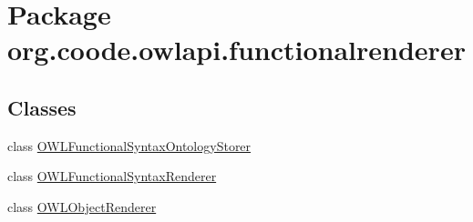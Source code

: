 \hypertarget{namespaceorg_1_1coode_1_1owlapi_1_1functionalrenderer}{\section{Package org.\-coode.\-owlapi.\-functionalrenderer}
\label{namespaceorg_1_1coode_1_1owlapi_1_1functionalrenderer}
}
\subsection*{Classes}
\begin{DoxyCompactItemize}
\item 
class \hyperlink{classorg_1_1coode_1_1owlapi_1_1functionalrenderer_1_1_o_w_l_functional_syntax_ontology_storer}{O\-W\-L\-Functional\-Syntax\-Ontology\-Storer}
\item 
class \hyperlink{classorg_1_1coode_1_1owlapi_1_1functionalrenderer_1_1_o_w_l_functional_syntax_renderer}{O\-W\-L\-Functional\-Syntax\-Renderer}
\item 
class \hyperlink{classorg_1_1coode_1_1owlapi_1_1functionalrenderer_1_1_o_w_l_object_renderer}{O\-W\-L\-Object\-Renderer}
\end{DoxyCompactItemize}

